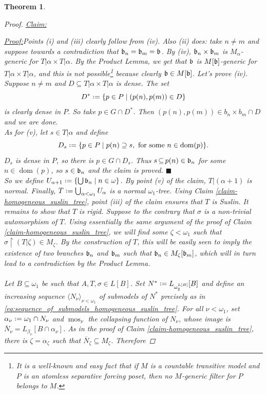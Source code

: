 \documentclass[11pt,a4paper]{report}
\newtheorem{theorem}{Theorem}[chapter] %
\theoremstyle{definition}
\theoremstyle{num.custom-title}
\theoremstyle{custom-title}
\newenvironment{claim}[1]{\par\noindent\underline{Claim#1:}\space}{} %
\newenvironment{claimproof}[1]{\par\noindent\underline{Proof:}\space#1}{\leavevmode\unskip\penalty9999 \hbox{}\nobreak\hfill\quad\hbox{$\blacksquare$}} %
\DeclareMathOperator{\dom}{dom}
\DeclareMathOperator{\sse}{\subseteq}
\DeclareMathOperator{\restr}{\upharpoonright}
\DeclareMathOperator{\mos}{mos}
\newcommand{\ol}{\overline}
\newcommand*{\defeq}{\mathrel{\rlap{%
                     \raisebox{0.3ex}{$\cdot$}}%
                     \raisebox{-0.3ex}{$\cdot$}}%
                     =}
\begin{document}
\begin{theorem}
\begin{proof}
\begin{claim}{}
\begin{claimproof}
Points (i) and (iii) clearly follow from (iv). Also (ii) does: take $n \neq m$  and suppose towards a contradiction that $\mathfrak{b}_n = \mathfrak{b}_m = \mathfrak{b}$. By (iv), $\mathfrak{b}_n \times \mathfrak{b}_m$ is $M_\alpha$-generic for $T|\alpha \times T|\alpha$. By the Product Lemma, we get that $\mathfrak{b}$ is $M[\mathfrak{b}]$-generic for $T|\alpha \times T|\alpha$, and this is not possible\footnote{It is a well-known and easy fact that if $M$ is a countable transitive model and $P$ is an atomless separative forcing poset, then no $M$-generic filter for $P$ belongs to $M$.} because clearly $\mathfrak{b} \in M[\mathfrak{b}]$. Let's prove (iv). Suppose $n \neq m$ and $D \sse T|\alpha \times T|\alpha$ is dense. The set
\[
D^* \defeq \{p \in P \mid (p(n),p(m)) \in D\}
\]
is clearly dense in $P$. So take $p \in G \cap D^*$. Then $(p(n),p(m)) \in b_n \times b_m \cap D$ and we are done.\\
As for (v), let $s \in T|\alpha$ and define
\[
D_s \defeq \{p \in P \mid p(n) \supseteq s, \text{ for some } n \in \dom(p)\}.
\]
$D_s$ is dense in $P$, so there is $p \in G \cap D_s$. Thus $s \sse p(n) \in \b_n$ for some $n \in \dom(p)$, so $s \in \mathfrak{b}_n$ and the claim is proved.
\end{claimproof}
\end{claim}\\[10pt]
So we define $U_{\alpha+1} \defeq \{\bigcup \b_n \mid n \in \omega\}$. By point (v) of the claim, $T|(\alpha+1)$ is normal. Finally, $T \defeq \bigcup_{\alpha < \omega_1} U_\alpha$ is a normal $\omega_1$-tree. Using Claim \ref{claim-homogeneous_suslin_tree}, point (iii) of the claim ensures that $T$ is Suslin. It remains to show that $T$ is rigid. Suppose to the contrary that $\sigma$ is a non-trivial automorphism of $T$. Using essentially the same argument of the proof of Claim \ref{claim-homogeneous_suslin_tree}, we will find some $\zeta < \omega_1$ such that $\sigma \restr (T|\zeta) \in M_\zeta$. By the construction of $T$, this will be easily seen to imply the existence of two branches $\mathfrak{b}_n$ and $\mathfrak{b}_m$ such that $\mathfrak{b}_n \in M_\zeta[\mathfrak{b}_m]$, which will in turn lead to a contradiction by the Product Lemma.\\
\\
Let $B \sse \omega_1$ be such that $A, T, \sigma \in L[B]$. Set $N^* \defeq L_{\omega_2^{L[B]}}[B]$ and define an increasing sequence $\langle N_\nu \rangle_{\nu < \omega_1}$ of submodels of $N^*$ precisely as in \eqref{eq:sequence_of_submodels_homogeneous_suslin_tree}. For all $\nu < \omega_1$, set $\alpha_\nu \defeq \omega_1 \cap N_\nu$ and $\mos_\nu$ the collapsing function of $N_\nu$, whose image is $\ol{N}_\nu = L_{\beta_\nu}[B \cap \alpha_\nu]$. As in the proof of Claim \ref{claim-homogeneous_suslin_tree}, there is $\zeta = \alpha_\zeta$ such that $\ol{N}_\zeta \sse M_\zeta$. Therefore

\end{proof}
\end{theorem}
\end{document}
